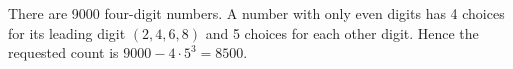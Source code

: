 There are 9000 four-digit numbers. A number with only even digits has 4 choices for its leading digit $(2,4,6,8)$ and 5 choices for each other digit. Hence the requested count is $9000-4\cdot5^3=\boxed{8500}$.
